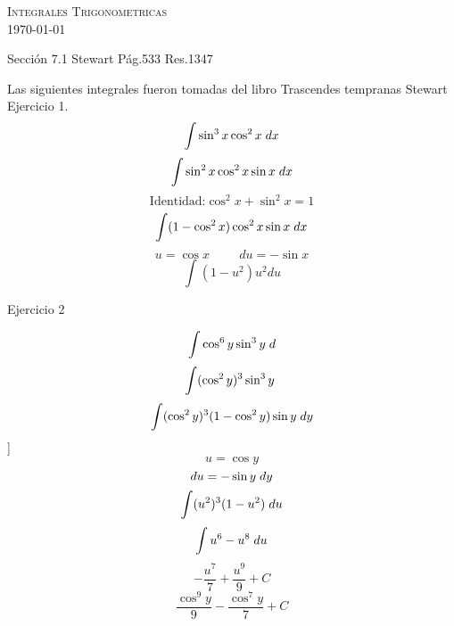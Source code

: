 \documentclass{amsart}
\begin{document}
    \begin{center}
        \textsc{ Integrales Trigonometricas} \\
        \today
    \end{center}
    \begin{flushleft}
        Sección 7.1 Stewart Pág.533 Res.1347
    \end{flushleft}
    Las siguientes integrales fueron tomadas del libro Trascendes tempranas Stewart
    Ejercicio 1.
    \[\int \sin^{3}{x}\cos^{2}{x} \hspace{1mm} dx\]
    \[\int \sin^{2}{x}\cos^{2}{x}\sin{x} \hspace{1mm} dx\]
    \[\text{Identidad:} \cos^{2}{x}+\sin^{2}{x}=1\]
    \[\int (1-\cos^{2}{x})\cos^{2}{x}\sin{x} \hspace{1mm} dx\]
    \[u = \cos{x} \hspace{1cm} du = -\sin{x}\]
    \[\int (1 - u^{2})u^{2} du\]
    
    Ejercicio 2 
    
    \[\int \cos^{6}{y}\sin^{3}{y} \hspace{1mm} d\]
    \[\int (\cos^{2}{y})^{3}\sin^{3}{y} \hspace{1mm}\]
    \[\int (\cos^{2}{y})^{3}(1-\cos^{2}{y})\sin{y} \hspace{1mm} dy\]]
    \[ u = \cos{y}\]
    \[ du = -\sin{y} \hspace{1mm} dy\]
    \[\int (u^{2})^{3}(1 - u^{2}) \hspace{1mm} du\]
    \[\int u^{6} - u^{8} \hspace{1mm} du\]
    \[-\frac{u^{7}}{7} + \frac{u^{9}}{9} + C\]
    \[\frac{\cos^{9}{y}}{9} - \frac{\cos^{7}{y}}{7} + C\]
    
    
    
\end{document}
